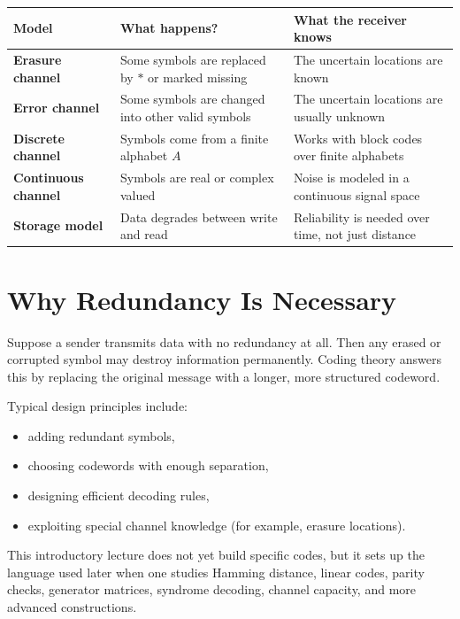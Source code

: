 \documentclass[11pt]{article}
\begin{document}
\begin{center}
\renewcommand{\arraystretch}{1.35}
\begin{tabular}{>{\bfseries}p{}p{}p{}}
\toprule
Model & What happens? & What the receiver knows \\
\midrule
Erasure channel & Some symbols are replaced by $\ast$ or marked missing & The uncertain locations are known \\
Error channel & Some symbols are changed into other valid symbols & The uncertain locations are usually unknown \\
Discrete channel & Symbols come from a finite alphabet $A$ & Works with block codes over finite alphabets \\
Continuous channel & Symbols are real or complex valued & Noise is modeled in a continuous signal space \\
Storage model & Data degrades between write and read & Reliability is needed over time, not just distance \\
\bottomrule
\end{tabular}
\end{center}

\section{Why Redundancy Is Necessary}

Suppose a sender transmits data with no redundancy at all. Then any erased or corrupted
symbol may destroy information permanently. Coding theory answers this by replacing the
original message with a longer, more structured codeword.

Typical design principles include:
\begin{itemize}[leftmargin=2em]
  \item adding redundant symbols,
  \item choosing codewords with enough separation,
  \item designing efficient decoding rules,
  \item exploiting special channel knowledge (for example, erasure locations).
\end{itemize}

This introductory lecture does not yet build specific codes, but it sets up the language
used later when one studies Hamming distance, linear codes, parity checks, generator
matrices, syndrome decoding, channel capacity, and more advanced constructions.
\end{document}
